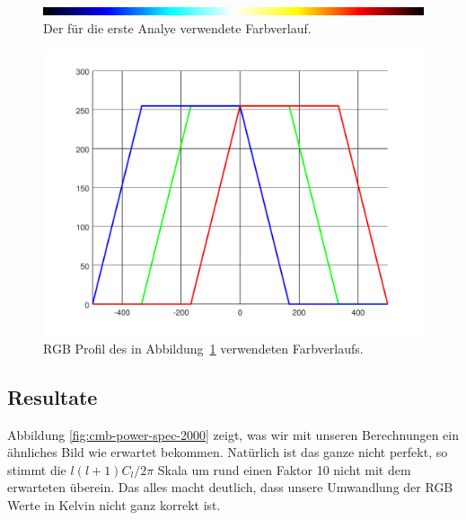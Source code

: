 \begin{figure}
	\centering
	\includegraphics[width=\linewidth]{cmb/converter/converter-function-strip.png}
	\caption{Der für die erste Analye verwendete Farbverlauf.}
	\label{fig:color-strip}
\end{figure}

\begin{figure}
	\centering
	\includegraphics[width=\linewidth]{cmb/converter/converter-function.pdf}
	\caption{RGB Profil des in Abbildung~\ref{fig:color-strip} 
		verwendeten Farbverlaufs.}
	\label{fig:color-strip-rgb}
\end{figure}

\subsection{Resultate \label{subsec:cmb:results}}

Abbildung \ref{fig:cmb-power-spec-2000} zeigt, was wir mit unseren Berechnungen 
ein ähnliches Bild wie erwartet bekommen. Natürlich ist das ganze nicht 
perfekt, so stimmt die $l(l+1)C_l/2\pi$ Skala um rund einen Faktor 10 nicht mit 
dem erwarteten überein. Das alles macht deutlich, dass unsere Umwandlung der 
RGB Werte in Kelvin nicht ganz korrekt ist.

